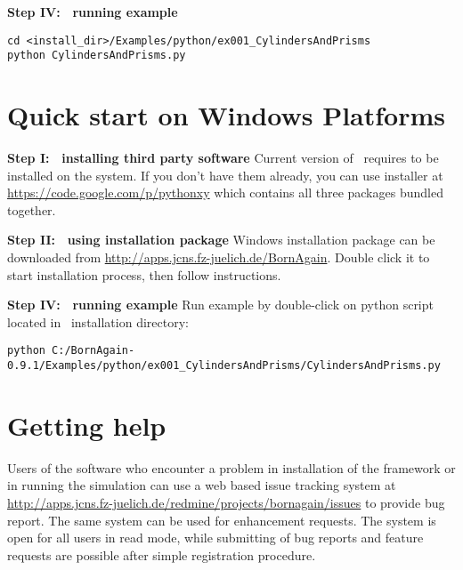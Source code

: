 \noindent
{\bf Step IV: $~$ running example}
\begin{lstlisting}[language=shell, style=commandline]
cd <install_dir>/Examples/python/ex001_CylindersAndPrisms
python CylindersAndPrisms.py
\end{lstlisting}



\section{Quick start on Windows Platforms}

\noindent
{\bf Step I: $~$ installing third party software} \newline
Current version of \BornAgain\ requires  
to be installed on the system.
If you don't have them already, you can use  installer
at \url{https://code.google.com/p/pythonxy} which contains all three packages bundled
together.
\vspace*{2mm}

\noindent
{\bf Step II: $~$ using installation package } \newline
Windows installation package can be downloaded from \url{http://apps.jcns.fz-juelich.de/BornAgain}.
Double click it to start installation process, then follow instructions.
\vspace*{2mm}

\noindent
{\bf Step IV: $~$ running example} \newline
Run example by double-click on python script located in \BornAgain\ installation directory:
\begin{lstlisting}[language=shell, style=commandline]
python C:/BornAgain-0.9.1/Examples/python/ex001_CylindersAndPrisms/CylindersAndPrisms.py
\end{lstlisting}


\section{Getting help}
Users of the software who encounter a problem in installation of the framework or in running the simulation can use a web based issue tracking system
at \url{http://apps.jcns.fz-juelich.de/redmine/projects/bornagain/issues} to provide bug
report. The same system can be used for enhancement requests.
The system is open for all users in read mode, while 
submitting of bug reports and feature requests are possible after simple registration
procedure.






